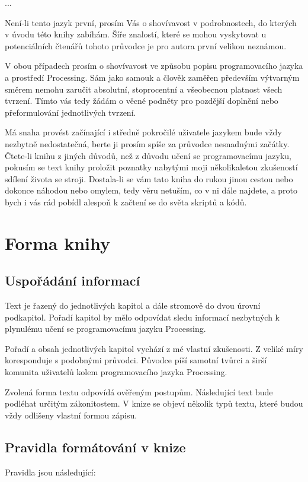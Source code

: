 \documentclass[11pt]{book}
\newcommand{\oddil}[1]{\section{#1}\label{sec:#1}}
\newcommand{\pododdil}[1]{\subsection{#1}\label{subsec:#1}}
\begin{document}
...

Není-li tento jazyk první, prosím Vás o shovívavost v podrobnostech, do kterých v úvodu této knihy zabíhám. Šíře znalostí, které se mohou vyskytovat u potenciálních čtenářů tohoto průvodce je pro autora první velikou neznámou.

V obou případech prosím o shovívavost ve způsobu popisu programovacího jazyka a prostředí Processing. Sám jako samouk a člověk zaměřen především výtvarným směrem nemohu zaručit absolutní, stoprocentní a všeobecnou platnost všech tvrzení. Tímto vás tedy žádám o věcné podněty pro pozdější doplnění nebo přeformulování jednotlivých tvrzení.

Má snaha provést začínající i středně pokročilé uživatele jazykem bude vždy nezbytně nedostatečná, berte ji prosím spíše za průvodce nesnadnými začátky. Čtete-li knihu z jiných důvodů, než z důvodu učení se programovacímu jazyku, pokusím se text knihy proložit poznatky nabytými moji několikaletou zkušeností sdílení života se stroji. Dostala-li se vám tato kniha do rukou jinou cestou nebo dokonce náhodou nebo omylem, tedy věru netuším, co v ni dále najdete, a proto bych i vás rád pobídl alespoň k začtení se do světa skriptů a kódů.

\oddil{Forma knihy}

\pododdil{Uspořádání informací}

Text je řazený do jednotlivých  kapitol a dále stromově do dvou úrovní podkapitol. Pořadí kapitol by mělo odpovídat sledu informací nezbytných k plynulému učení se programovacímu jazyku Processing.

Pořadí a obsah jednotlivých kapitol vychází z mé vlastní zkušenosti. Z veliké míry koresponduje s podobnými průvodci. Původce píší samotní tvůrci a širší komunita uživatelů kolem programovacího jazyka Processing.

Zvolená forma textu odpovídá ověřeným postupům. Následující text bude podléhat určitým zákonitostem. V knize se objeví několik typů textu, které budou vždy odlišeny vlastní formou zápisu.

\pododdil{Pravidla formátování v knize}

Pravidla jsou následující:
\end{document}
